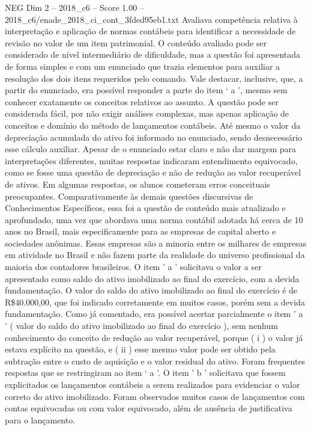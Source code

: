 \begin{textsample}{NEG Dim 2 – 2018\_c6 – Score 1.00 – 2018\_c6/enade\_2018\_ci\_cont\_3fded95eb1.txt}
Avaliava competência relativa à interpretação e aplicação de normas contábeis para identificar a necessidade de revisão no valor de um item patrimonial.
O conteúdo avaliado pode ser considerado de nível intermediário de dificuldade, mas a questão foi apresentada de forma simples e com um enunciado que trazia elementos para auxiliar a resolução dos dois itens requeridos pelo comando.
Vale destacar, inclusive, que, a partir do enunciado, era possível responder a parte do item ‘ a ’, mesmo sem conhecer exatamente os conceitos relativos ao assunto.
A questão pode ser considerada fácil, por não exigir análises complexas, mas apenas aplicação de conceitos e domínio do método de lançamentos contábeis.
Até mesmo o valor da depreciação acumulada do ativo foi informado no enunciado, sendo desnecessário esse cálculo auxiliar.
Apesar de o enunciado estar claro e não dar margem para interpretações diferentes, muitas respostas indicaram entendimento equivocado, como se fosse uma questão de depreciação e não de redução ao valor recuperável de ativos.
Em algumas respostas, os alunos cometeram erros conceituais preocupantes.
Comparativamente às demais questões discursivas de Conhecimentos Específicos, essa foi a questão de conteúdo mais atualizado e aprofundado, uma vez que abordava uma norma contábil adotada há cerca de 10 anos no Brasil, mais especificamente para as empresas de capital aberto e sociedades anônimas.
Essas empresas são a minoria entre os milhares de empresas em atividade no Brasil e não fazem parte da realidade do universo profissional da maioria dos contadores brasileiros.
O item ' a ' solicitava o valor a ser apresentado como saldo do ativo imobilizado ao final do exercício, com a devida fundamentação.
O valor do saldo do ativo imobilizado ao final do exercício é de R\$40.000,00, que foi indicado corretamente em muitos casos, porém sem a devida fundamentação.
Como já comentado, era possível acertar parcialmente o item ' a ' ( valor do saldo do ativo imobilizado ao final do exercício ), sem nenhum conhecimento do conceito de redução ao valor recuperável, porque ( i ) o valor já estava explícito na questão, e ( ii ) esse mesmo valor pode ser obtido pela subtração entre o custo de aquisição e o valor residual do ativo.
Foram frequentes respostas que se restringiram ao item ‘ a ’.
O item ' b ' solicitava que fossem explicitados os lançamentos contábeis a serem realizados para evidenciar o valor correto do ativo imobilizado.
Foram observados muitos casos de lançamentos com contas equivocadas ou com valor equivocado, além de ausência de justificativa para o lançamento.

\end{textsample}
